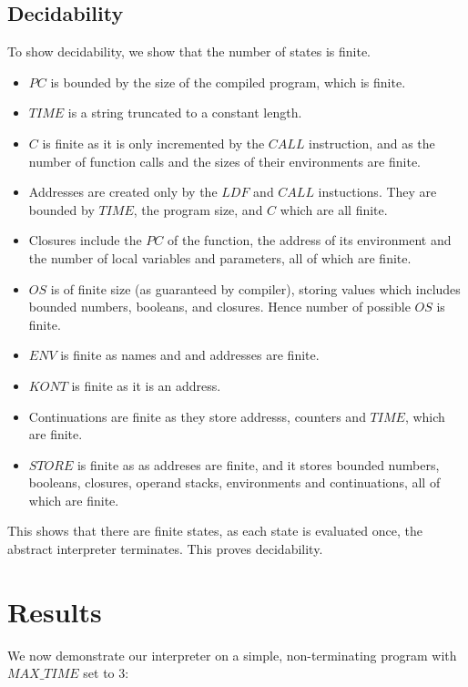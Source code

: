 \documentclass[12pt]{article}
\begin{document}
\subsection{Decidability}
To show decidability, we show that the number of states is finite. 
\begin{itemize}
  \item $PC$ is bounded by the size of the compiled program, which is finite.
        
  \item $TIME$ is a string truncated to a constant length.
        
  \item $C$ is finite as it is only incremented by the $CALL$ instruction, and as the number of function calls and the sizes of their environments are finite.
        
  \item Addresses are created only by the $LDF$ and $CALL$ instuctions. They are bounded by $TIME$, the program size, and $C$ which are all finite.
        
  \item Closures include the $PC$ of the function, the address of its environment and the number of local variables and parameters, all of which are finite.
        
  \item $OS$ is of finite size (as guaranteed by compiler), storing values which includes bounded numbers, booleans, and closures. Hence number of possible $OS$ is finite.
        
  \item $ENV$ is finite as names and and addresses are finite.
        
  \item $KONT$ is finite as it is an address.
        
  \item Continuations are finite as they store addresss, counters and $TIME$, which are finite.
        
  \item $STORE$ is finite as as addreses are finite, and it stores bounded numbers, booleans, closures, operand stacks, environments and continuations, all of which are finite.
\end{itemize}

This shows that there are finite states, as each state is evaluated once, the abstract interpreter terminates. This proves decidability.

\section{Results}
We now demonstrate our interpreter on a simple, non-terminating program with $MAX\_TIME$ set to 3:
\end{document}
